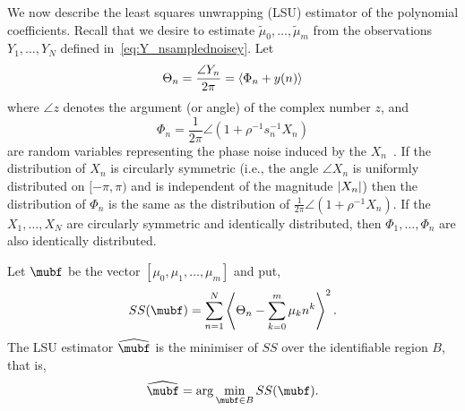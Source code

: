 \documentclass[journal]{IEEEtran}
\begin{document}
We now describe the least squares unwrapping (LSU) estimator of the polynomial coefficients. Recall that we desire to estimate $\tilde{\mu}_0, \dots, \tilde{\mu}_m$ from the observations $Y_1, \dots, Y_N$ defined in~\eqref{eq:Y_nsamplednoisey}.  Let
\begin{equation}\label{eq:noise_circ_poly}
\Theta_n = \frac{\angle{Y_n}}{2\pi} = \left\langle  \Phi_n + y(n)  \right\rangle
\end{equation}
where $\angle z$ denotes the argument (or angle) of the complex number $z$, and 
\[
\Phi_n = \frac{1}{2\pi}\angle(1 + \rho^{-1}s_n^{-1}X_n)
\] 
are random variables representing the phase noise induced by the $X_n$~\cite{Tretter1985,Quinn2009_dasp_phase_only_information_loss}.  If the distribution of $X_n$ is circularly symmetric (i.e., the angle $\angle X_n$ is uniformly distributed on $[-\pi, \pi)$ and is independent of the magnitude $\left\vert X_n \right\vert$) then the distribution of $\Phi_n$ is the same as the distribution of $\tfrac{1}{2\pi}\angle(1 + \rho^{-1}X_n)$.  If the $X_1, \dots, X_N$ are circularly symmetric and identically distributed, then $\Phi_1, \dots, \Phi_n$ are also identically distributed.

Let $\mubf$ be the vector $[\mu_0, \mu_1, \dots, \mu_m]$ and put,
\begin{equation} \label{eq:sumofsquaresfunction}
SS(\mubf) = \sum_{n=1}^{N}\fracpart{  \Theta_{n} - \sum_{k = 0}^{m}{\mu_k n^k} }^{2}.
\end{equation}
The LSU estimator $\widehat{\mubf}$ is the minimiser of $SS$ over the identifiable region $B$, that is,
\begin{equation}\label{eq:hatmubfLSUdefn}
\widehat{\mubf} = \arg \min_{\mubf \in B} SS(\mubf). 
\end{equation}
\end{document}
